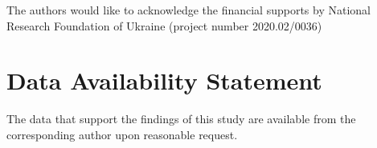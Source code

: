 \documentclass[%
 aip,
 amsmath,amssymb,
 reprint,%
]{revtex4-1}
\begin{document}
%

\begin{acknowledgments}
The authors would like to acknowledge the financial supports by National Research Foundation  of Ukraine
(project number 2020.02/0036)
\end{acknowledgments}

\section*{Data Availability Statement}

The data that support the findings of this study are available from the corresponding author upon reasonable request.
\end{document}
